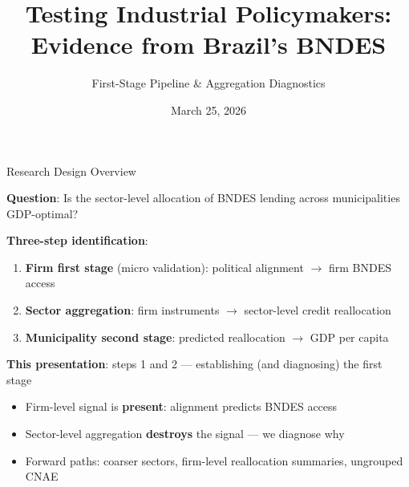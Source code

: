 \documentclass[aspectratio=169,11pt]{beamer}
\title{Testing Industrial Policymakers:\\Evidence from Brazil's BNDES}
\subtitle{First-Stage Pipeline \& Aggregation Diagnostics}
\author{}
\date{March 25, 2026}
\begin{document}
\begin{frame}
\titlepage
\end{frame}

\begin{frame}{Research Design Overview}

\textbf{Question}: Is the sector-level allocation of BNDES lending across municipalities GDP-optimal?

\medskip

\textbf{Three-step identification}:
\begin{enumerate}
    \item \textbf{Firm first stage} (micro validation): political alignment $\to$ firm BNDES access
    \item \textbf{Sector aggregation}: firm instruments $\to$ sector-level credit reallocation
    \item \textbf{Municipality second stage}: predicted reallocation $\to$ GDP per capita
\end{enumerate}

\medskip

\textbf{This presentation}: steps 1 and 2 --- establishing (and diagnosing) the first stage

\smallskip

\begin{itemize}
    \item Firm-level signal is \textbf{present}: alignment predicts BNDES access
    \item Sector-level aggregation \textbf{destroys} the signal --- we diagnose why
    \item Forward paths: coarser sectors, firm-level reallocation summaries, ungrouped CNAE
\end{itemize}

\end{frame}
\end{document}
